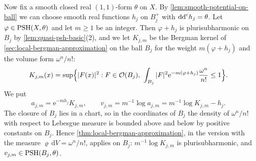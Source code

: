 Now fix a smooth closed real $(1,1)$-form $\theta$ on $X$. By \cref{lem:smooth-potential-on-ball} we can choose smooth real functions $h_j$ on $B_j^+$ with $\mathrm{dd}^{\mathrm{c}} h_j=\theta$. Let $\varphi\in\mathrm{PSH}(X,\theta)$ and let $m\geq1$ be an integer. Then $\varphi+h_j$ is plurisubharmonic on $B_j$ by \cref{lem:quasi-psh-basic}(2), and we let $K_{j,m}$ be the Bergman kernel of \cref{sec:local-bergman-approximation} on the ball $B_j$ for the weight $m(\varphi+h_j)$ and the volume form $\omega^n/n!$:
\[
 K_{j,m}(x)=\sup\Bigl\{|F(x)|^2:F\in\mathcal O(B_j),\ \int_{B_j}|F|^2\mathrm e^{-m(\varphi+h_j)}\frac{\omega^n}{n!}\leq1\Bigr\}.
\]
We put
\[
 a_{j,m}=\mathrm e^{-mh_j}K_{j,m},\qquad
 v_{j,m}=m^{-1}\log a_{j,m}=m^{-1}\log K_{j,m}-h_j.
\]
The closure of $B_j$ lies in a chart, so in the coordinates of $B_j$ the density of $\omega^n/n!$ with respect to Lebesgue measure is bounded above and below by positive constants on $B_j$. Hence \cref{thm:local-bergman-approximation}, in the version with the measure $\varrho\,\mathrm dV=\omega^n/n!$, applies on $B_j$: $m^{-1}\log K_{j,m}$ is plurisubharmonic, and $v_{j,m}\in\mathrm{PSH}(B_j,\theta)$.

